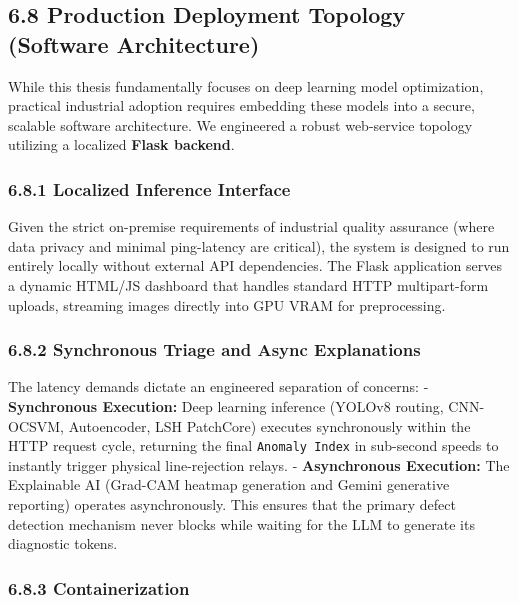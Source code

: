 \documentclass[12pt, a4paper, oneside]{report}
\begin{document}
\bigskip\noindent\hrulefill\bigskip

\subsection{6.8 Production Deployment Topology (Software Architecture)}\label{production-deployment-topology-software-architecture}

While this thesis fundamentally focuses on deep learning model optimization, practical industrial adoption requires embedding these models into a secure, scalable software architecture. We engineered a robust web-service topology utilizing a localized \textbf{Flask backend}.

\subsubsection{6.8.1 Localized Inference Interface}\label{localized-inference-interface}

Given the strict on-premise requirements of industrial quality assurance (where data privacy and minimal ping-latency are critical), the system is designed to run entirely locally without external API dependencies. The Flask application serves a dynamic HTML/JS dashboard that handles standard HTTP multipart-form uploads, streaming images directly into GPU VRAM for preprocessing.

\subsubsection{6.8.2 Synchronous Triage and Async Explanations}\label{synchronous-triage-and-async-explanations}

The latency demands dictate an engineered separation of concerns: - \textbf{Synchronous Execution:} Deep learning inference (YOLOv8 routing, CNN-OCSVM, Autoencoder, LSH PatchCore) executes synchronously within the HTTP request cycle, returning the final \texttt{Anomaly\ Index} in sub-second speeds to instantly trigger physical line-rejection relays. - \textbf{Asynchronous Execution:} The Explainable AI (Grad-CAM heatmap generation and Gemini generative reporting) operates asynchronously. This ensures that the primary defect detection mechanism never blocks while waiting for the LLM to generate its diagnostic tokens.

\subsubsection{6.8.3 Containerization}\label{containerization}
\end{document}
